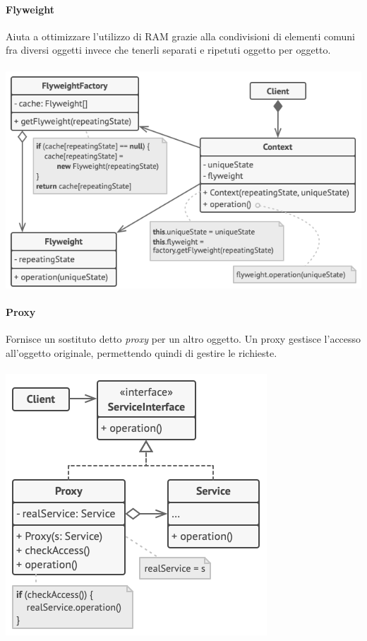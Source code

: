 \documentclass{article}
\begin{document}
            \paragraph{Flyweight} Aiuta a ottimizzare l'utilizzo di RAM grazie alla condivisioni di elementi comuni fra diversi oggetti invece che tenerli separati e ripetuti oggetto per oggetto.
            \paragraph{}\includegraphics[scale=0.5]{./img/flyweight.png}

            \paragraph{Proxy} Fornisce un sostituto detto \textit{proxy} per un altro oggetto.
                Un proxy gestisce l'accesso all'oggetto originale, permettendo quindi di gestire le richieste.
            \paragraph{}\includegraphics[scale=0.6]{./img/proxy.png}
                
\end{document}
